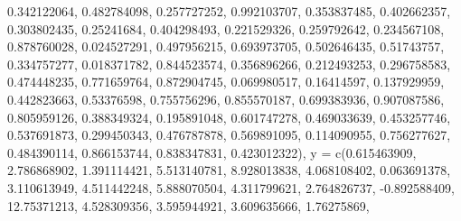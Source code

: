 \documentclass[
  11pt,
]{article}
\newenvironment{Shaded}{\begin{snugshade}}{\end{snugshade}}
\newcommand{\AttributeTok}[1]{\textcolor[rgb]{0.40,0.45,0.13}{#1}}
\newcommand{\FloatTok}[1]{\textcolor[rgb]{0.68,0.00,0.00}{#1}}
\newcommand{\FunctionTok}[1]{\textcolor[rgb]{0.28,0.35,0.67}{#1}}
\newcommand{\NormalTok}[1]{\textcolor[rgb]{0.00,0.23,0.31}{#1}}
\newcommand{\SpecialCharTok}[1]{\textcolor[rgb]{0.37,0.37,0.37}{#1}}
\begin{document}
\begin{Shaded}
\begin{Highlighting}[]
        \FloatTok{0.342122064}\NormalTok{, }\FloatTok{0.482784098}\NormalTok{, }\FloatTok{0.257727252}\NormalTok{, }\FloatTok{0.992103707}\NormalTok{, }\FloatTok{0.353837485}\NormalTok{, }\FloatTok{0.402662357}\NormalTok{, }
        \FloatTok{0.303802435}\NormalTok{, }\FloatTok{0.25241684}\NormalTok{, }\FloatTok{0.404298493}\NormalTok{, }\FloatTok{0.221529326}\NormalTok{, }\FloatTok{0.259792642}\NormalTok{, }\FloatTok{0.234567108}\NormalTok{, }
        \FloatTok{0.878760028}\NormalTok{, }\FloatTok{0.024527291}\NormalTok{, }\FloatTok{0.497956215}\NormalTok{, }\FloatTok{0.693973705}\NormalTok{, }\FloatTok{0.502646435}\NormalTok{, }\FloatTok{0.51743757}\NormalTok{, }
        \FloatTok{0.334757277}\NormalTok{, }\FloatTok{0.018371782}\NormalTok{, }\FloatTok{0.844523574}\NormalTok{, }\FloatTok{0.356896266}\NormalTok{, }\FloatTok{0.212493253}\NormalTok{, }\FloatTok{0.296758583}\NormalTok{, }
        \FloatTok{0.474448235}\NormalTok{, }\FloatTok{0.771659764}\NormalTok{, }\FloatTok{0.872904745}\NormalTok{, }\FloatTok{0.069980517}\NormalTok{, }\FloatTok{0.16414597}\NormalTok{, }\FloatTok{0.137929959}\NormalTok{, }
        \FloatTok{0.442823663}\NormalTok{, }\FloatTok{0.53376598}\NormalTok{, }\FloatTok{0.755756296}\NormalTok{, }\FloatTok{0.855570187}\NormalTok{, }\FloatTok{0.699383936}\NormalTok{, }\FloatTok{0.907087586}\NormalTok{, }
        \FloatTok{0.805959126}\NormalTok{, }\FloatTok{0.388349324}\NormalTok{, }\FloatTok{0.195891048}\NormalTok{, }\FloatTok{0.601747278}\NormalTok{, }\FloatTok{0.469033639}\NormalTok{, }\FloatTok{0.453257746}\NormalTok{, }
        \FloatTok{0.537691873}\NormalTok{, }\FloatTok{0.299450343}\NormalTok{, }\FloatTok{0.476787878}\NormalTok{, }\FloatTok{0.569891095}\NormalTok{, }\FloatTok{0.114090955}\NormalTok{, }\FloatTok{0.756277627}\NormalTok{, }
        \FloatTok{0.484390114}\NormalTok{, }\FloatTok{0.866153744}\NormalTok{, }\FloatTok{0.838347831}\NormalTok{, }\FloatTok{0.423012322}\NormalTok{),}
  \AttributeTok{y =} \FunctionTok{c}\NormalTok{(}\FloatTok{0.615463909}\NormalTok{, }\FloatTok{2.786868902}\NormalTok{, }\FloatTok{1.391114421}\NormalTok{, }\FloatTok{5.513140781}\NormalTok{, }\FloatTok{8.928013838}\NormalTok{, }\FloatTok{4.068108402}\NormalTok{,}
        \FloatTok{0.063691378}\NormalTok{, }\FloatTok{3.110613949}\NormalTok{, }\FloatTok{4.511442248}\NormalTok{, }\FloatTok{5.888070504}\NormalTok{, }\FloatTok{4.311799621}\NormalTok{, }\FloatTok{2.764826737}\NormalTok{,}
        \SpecialCharTok{{-}}\FloatTok{0.892588409}\NormalTok{, }\FloatTok{12.75371213}\NormalTok{, }\FloatTok{4.528309356}\NormalTok{, }\FloatTok{3.595944921}\NormalTok{, }\FloatTok{3.609635666}\NormalTok{, }\FloatTok{1.76275869}\NormalTok{,}

\end{Highlighting}
\end{Shaded}
\end{document}
